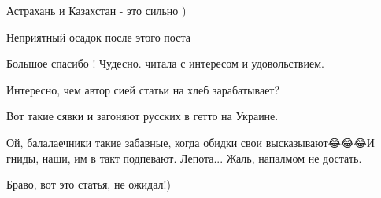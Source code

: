 \begin{itemize}
Астрахань и Казахстан - это сильно )

 
Неприятный осадок после этого поста 🤔

 
Большое спасибо ! Чудесно. читала с интересом и удовольствием.

 
Интересно, чем автор сией статьи на хлеб зарабатывает?

 
Вот такие сявки и загоняют русских в гетто на Украине.

 
Ой, балалаечники такие забавные, когда обидки свои высказывают😂😂😂И гниды, наши, им в такт подпевают. Лепота... Жаль, напалмом не достать.

 
Браво, вот это статья, не ожидал!)

 

\end{itemize}
